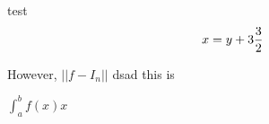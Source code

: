 \documentclass{article}
\begin{document}
    test
    $$
    x = y + 3 \frac{3}{2} \\
    $$

    However, $|| f - I_n ||$
    dsad this is

    $\int_a^b f(x) x$
\end{document}
